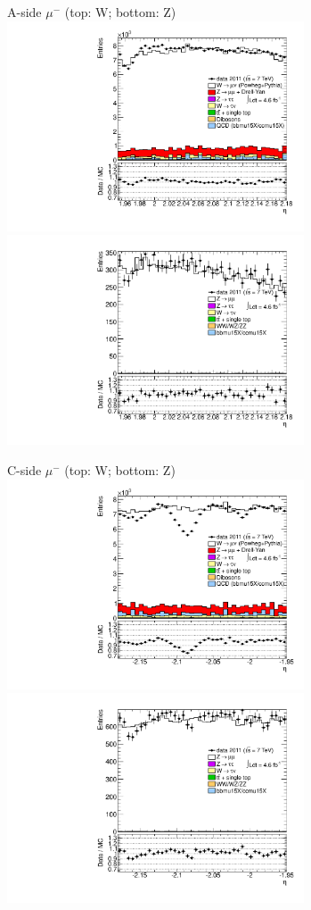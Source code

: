 {{
A-side $\mu^{-}$ (top: W; bottom: Z)
\centering
\includegraphics[width=0.66\textwidth]{dates/20130306/figures/etaphi/W_10_A_stack_l_eta_NEG} \\
\includegraphics[width=0.66\textwidth]{dates/20130306/figures/etaphi/ZlObarrel_10_A_stack_lN_eta_ALL.pdf} 

\cole
}



 {
\colb[T]

C-side $\mu^{-}$ (top: W; bottom: Z)
\centering
\includegraphics[width=0.66\textwidth]{dates/20130306/figures/etaphi/W_10_C_stack_l_eta_NEG} \\
\includegraphics[width=0.66\textwidth]{dates/20130306/figures/etaphi/ZlOendcap_10_C_stack_lN_eta_ALL.pdf}

}}
